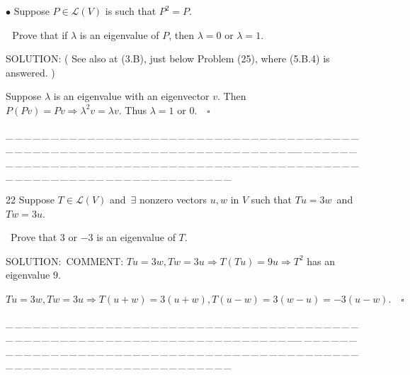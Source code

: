 \documentclass[a4paper, 11pt, UTF8]{article}
\def\Lm{\mathcal{L}}
\begin{document}
\begin{large}
{\small $\bullet$} {\timessl\Large 
Suppose $P\in\Lm(V)$ is such that $P^2 = P$.}\par\,\,
{\timessl\Large Prove that if $\lambda$ is an eigenvalue of $P$, then $\lambda = 0$ or $\lambda = 1$.
}\par
{\timesbf S\footnotesize{OLUTION:}} ( See also at (3.B), just below Problem (25), where (5.B.4) is answered. )\par\quad
Suppose $\lambda$ is an eigenvalue with an eigenvector $v.$ Then $P(Pv)=Pv\Rightarrow\lambda^2 v=\lambda v.$ Thus $\lambda=1$ or $0.\quad\square$\par
{\tiny \_\,\_\,\_\,\_\,\_\,\_\,\_\,\_\,\_\,\_\,\_\,\_\,\_\,\_\,\_\,\_\,\_\,\_\,\_\,\_\,\_\,\_\,\_\,\_\,\_\,\_\,\_\,\_\,\_\,\_\,\_\,\_\,\_\,\_\,\_\,\_\,\_\,\_\,\_\,\_\,\_\,\_\,\_\,\_\,\_\,\_\,\_\,\_\,\_\,\_\,\_\,\_\,\_\,\_\,\_\,\_\,\_\,\_\,\_\,\_\,\_\,\_\,\_\,\_\,\_\,\_\,\_\,\_\,\_\,\_\,\_\_\,\_\,\_\,\_\,\_\,\_\,\_\,\_\,\_\,\_\,\_\,\_\,\_\,\_\,\_\,\_\,\_\,\_\,\_\,\_\,\_\,\_\,\_\,\_\,\_\,\_\,\_\,\_\,\_\,\_\,\_\,\_\,\_\,\_\,\_\,\_\,\_\,\_\,\_\,\_\,\_\,\_\,\_\,\_\,\_\,\_\,\_\,\_\,\_\,\_\,\_\,\_\,\_\,\_\,\_\,\_\,\_\,\_\,\_\,\_\,\_\,\_\,\_\,\_\,\_\,\_\,\_\,\_\,\_\,\_\,\_}\par

{\timesbf\Large 22} {\timessl\Large 
Suppose $T\in\Lm(V)$ and $\,\exists$ nonzero vectors $u,w$ in $V$ such that $Tu = 3w$ \,{\normalsize\timessl and}\, $Tw = 3u$.}\par\quad\,
{\timessl\Large Prove that $3$ or $-3$ is an eigenvalue of $T$.
}\par
{\timesbf S\footnotesize{OLUTION:}}\,\,\,{\small C{\scriptsize OMMENT}: $Tu=3w,Tw=3u\Rightarrow T(Tu)=9u\Rightarrow T^2$ has an eigenvalue $9.$}\par\quad
$Tu=3w,Tw=3u\Rightarrow T(u+w)=3(u+w),T(u-w)=3(w-u)=-3(u-w).\quad\square$\par
{\tiny \_\,\_\,\_\,\_\,\_\,\_\,\_\,\_\,\_\,\_\,\_\,\_\,\_\,\_\,\_\,\_\,\_\,\_\,\_\,\_\,\_\,\_\,\_\,\_\,\_\,\_\,\_\,\_\,\_\,\_\,\_\,\_\,\_\,\_\,\_\,\_\,\_\,\_\,\_\,\_\,\_\,\_\,\_\,\_\,\_\,\_\,\_\,\_\,\_\,\_\,\_\,\_\,\_\,\_\,\_\,\_\,\_\,\_\,\_\,\_\,\_\,\_\,\_\,\_\,\_\,\_\,\_\,\_\,\_\,\_\,\_\_\,\_\,\_\,\_\,\_\,\_\,\_\,\_\,\_\,\_\,\_\,\_\,\_\,\_\,\_\,\_\,\_\,\_\,\_\,\_\,\_\,\_\,\_\,\_\,\_\,\_\,\_\,\_\,\_\,\_\,\_\,\_\,\_\,\_\,\_\,\_\,\_\,\_\,\_\,\_\,\_\,\_\,\_\,\_\,\_\,\_\,\_\,\_\,\_\,\_\,\_\,\_\,\_\,\_\,\_\,\_\,\_\,\_\,\_\,\_\,\_\,\_\,\_\,\_\,\_\,\_\,\_\,\_\,\_\,\_\,\_}\par


\end{large}
\end{document}
